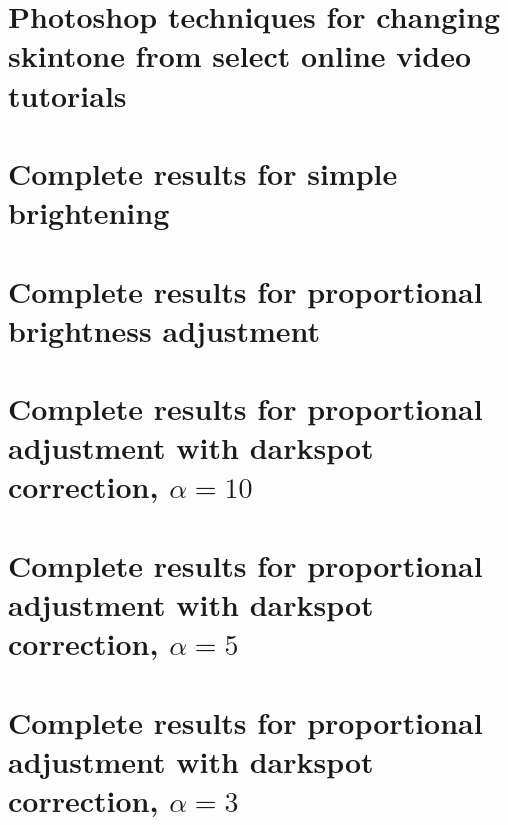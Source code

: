 \documentclass[12pt, a4paper]{article}
\begin{document}
\pagebreak



\pagebreak

\appendix

\section{Photoshop techniques for changing skintone from select online video tutorials}\label{app:photoshop}


\pagebreak

\section{Complete results for simple brightening}\label{app:boost}

\pagebreak

\section{Complete results for proportional brightness adjustment}\label{app:prop}

\pagebreak

\section{Complete results for proportional adjustment with darkspot correction, $\alpha = 10$}\label{app:prop_corr_a10}

\pagebreak

\section{Complete results for proportional adjustment with darkspot correction, $\alpha = 5$}\label{app:prop_corr_a5}

\pagebreak

\section{Complete results for proportional adjustment with darkspot correction, $\alpha = 3$}\label{app:prop_corr_a3}

\end{document}
